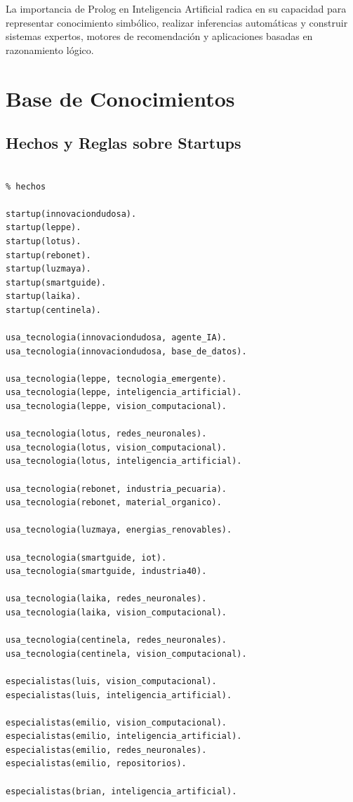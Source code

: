 \documentclass[12pt,a4paper]{article}
\begin{document}
La importancia de Prolog en Inteligencia Artificial radica en su capacidad para representar conocimiento simbólico, realizar inferencias automáticas y construir sistemas expertos, motores de recomendación y aplicaciones basadas en razonamiento lógico.

\section{Base de Conocimientos}

\subsection{Hechos y Reglas sobre Startups}

\begin{lstlisting}

% hechos

startup(innovaciondudosa).
startup(leppe).
startup(lotus).
startup(rebonet).
startup(luzmaya).
startup(smartguide).
startup(laika).
startup(centinela).

usa_tecnologia(innovaciondudosa, agente_IA).
usa_tecnologia(innovaciondudosa, base_de_datos).

usa_tecnologia(leppe, tecnologia_emergente).
usa_tecnologia(leppe, inteligencia_artificial).
usa_tecnologia(leppe, vision_computacional).

usa_tecnologia(lotus, redes_neuronales).
usa_tecnologia(lotus, vision_computacional).
usa_tecnologia(lotus, inteligencia_artificial).

usa_tecnologia(rebonet, industria_pecuaria).
usa_tecnologia(rebonet, material_organico).

usa_tecnologia(luzmaya, energias_renovables).

usa_tecnologia(smartguide, iot).
usa_tecnologia(smartguide, industria40).

usa_tecnologia(laika, redes_neuronales).
usa_tecnologia(laika, vision_computacional).

usa_tecnologia(centinela, redes_neuronales).
usa_tecnologia(centinela, vision_computacional).

especialistas(luis, vision_computacional).
especialistas(luis, inteligencia_artificial).

especialistas(emilio, vision_computacional).
especialistas(emilio, inteligencia_artificial).
especialistas(emilio, redes_neuronales).
especialistas(emilio, repositorios).

especialistas(brian, inteligencia_artificial).


\end{lstlisting}
\end{document}

